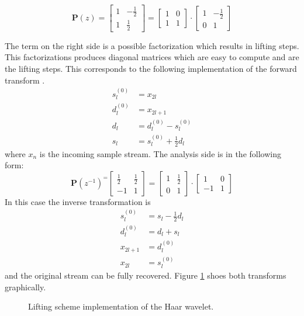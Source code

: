\begin{refsection}
\begin{equation*}
\bm P(z) =
\begin{bmatrix}
1 & -\frac{1}{2} \\
1 & \frac{1}{2}
\end{bmatrix}
 = 
 \begin{bmatrix}
 1 & 0 \\
 1 & 1
 \end{bmatrix}
 \cdot
 \begin{bmatrix}
 1 & -\frac{1}{2} \\
 0 & 1
 \end{bmatrix}
\end{equation*}

The term on the right side is a possible factorization which results in lifting steps.
This factorizations produces diagonal matrices which are easy to compute and are the lifting steps.
This corresponds to the following implementation of the forward transform \cite{fpga:Daubechies1998}.
\begin{equation}\label{fpga:equation:haar}
	\begin{aligned}
	s_l^{(0)} &= x_{2l} \\
	d_l^{(0)} &= x_{2l+1} \\ 
	d_l &= d_l^{(0)} - s_l^{(0)} \\
	s_l &= s_l^{(0)} + \frac{1}{2}d_l
	\end{aligned}
\end{equation}
where $x_{n}$ is the incoming sample stream.
The analysis side is in the following form:
\begin{equation*}
\bm P(z^{-1})^ =
\begin{bmatrix}
\frac{1}{2} & \frac{1}{2} \\
-1 & 1
\end{bmatrix}
= 
\begin{bmatrix}
1 & \frac{1}{2} \\
0 & 1
\end{bmatrix}
\cdot
\begin{bmatrix}
1 & 0 \\
-1 & 1
\end{bmatrix}
\end{equation*}
In this case the inverse transformation is 
\begin{equation}\label{fpga:equation:inv_haar}
\begin{aligned}
s_l^{(0)} &= s_l - \frac{1}{2}d_l \\
d_l^{(0)} &= d_l + s_l \\ 
x_{2l+1}& =d_l^{(0)} \\
x_{2l} &= s_l^{(0)}
\end{aligned}
\end{equation}
and the original stream can be fully recovered.
Figure \ref{fpga:fig:liftingStepHaar} shoes both transforms graphically.
\begin{figure}
	\centering
	
	\caption{Lifting scheme implementation of the Haar wavelet.}
	\label{fpga:fig:liftingStepHaar}
\end{figure}


\end{refsection}
